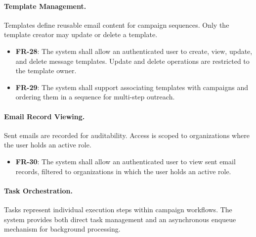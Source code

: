 \paragraph{Template Management.}
Templates define reusable email content for campaign sequences. Only the template creator may update or delete a template.

\begin{itemize}
    \item \textbf{FR-28}: The system shall allow an authenticated user to create, view, update, and delete message templates. Update and delete operations are restricted to the template owner.
    \item \textbf{FR-29}: The system shall support associating templates with campaigns and ordering them in a sequence for multi-step outreach.
\end{itemize}

\paragraph{Email Record Viewing.}
Sent emails are recorded for auditability. Access is scoped to organizations where the user holds an active role.

\begin{itemize}
    \item \textbf{FR-30}: The system shall allow an authenticated user to view sent email records, filtered to organizations in which the user holds an active role.
\end{itemize}

\paragraph{Task Orchestration.}
Tasks represent individual execution steps within campaign workflows. The system provides both direct task management and an asynchronous enqueue mechanism for background processing.

